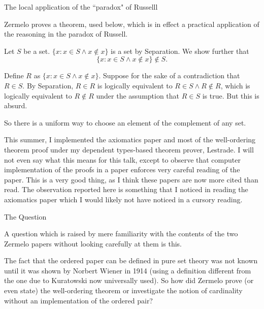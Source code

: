 \documentclass{slides}
\begin{document}
\begin{slide}

{\Large The local application of the ``paradox" of Russelll}

Zermelo proves a theorem, used below, which is in effect a practical application of the reasoning in the paradox of Russell.

Let $S$ be a set.  $\{x : x \in S \wedge x \not\in x\}$ is a set by Separation.  We show further that $$\{x : x \in S \wedge x \not\in x\} \not\in S.$$

Define $R$ as $\{x : x \in S \wedge x \not\in x\}$.  Suppose for the sake of a contradiction that $R \in S$.  By Separation, $R \in R$ is logically equivalent to
$R \in S \wedge R \not\in R$, which is logically equivalent to $R \not\in R$ under the assumption that $R \in S$ is true.  But this is absurd.

So there is a uniform way to choose an element of the complement of any set.

\end{slide}


\begin{slide}

This summer, I implemented the axiomatics paper and most of the well-ordering theorem proof under my dependent types-based theorem prover, Lestrade.  I will not even say what this means for this talk, except to observe that computer implementation of the proofs in a paper enforces very careful reading of the paper.  This is a very good thing, as I think these papers are now more cited than read.  The observation reported here is something that I noticed in reading the axiomatics paper which I would likely not have noticed in a cursory reading.

\end{slide}

\begin{slide}

{\Large The Question}

A question which is raised by mere familiarity with the contents of the two Zermelo papers without looking carefully at them is this.

The fact that the ordered paper can be defined in pure set theory was not known until it was shown by Norbert Wiener in 1914 (using a definition different from the one due to Kuratowski now universally used).  So how did Zermelo prove (or even state) the well-ordering theorem or investigate the notion of cardinality without an implementation of the ordered pair?


\end{slide}
\end{document}
